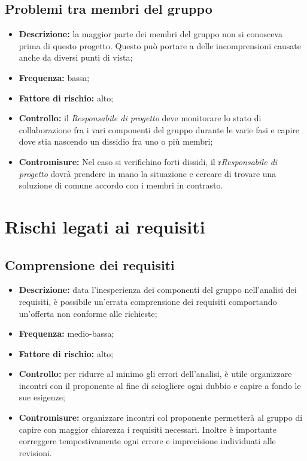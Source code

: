 \documentclass[./PianodiProgetto.tex]{subfiles}
\begin{document}
\subsection{Problemi tra membri del gruppo}
\begin{itemize}
	\item \textbf{Descrizione:} la maggior parte dei membri del gruppo non si conosceva prima di questo progetto. Questo può portare a delle incomprensioni causate anche da diversi punti di vista;
	\item \textbf{Frequenza:} bassa;
	\item \textbf{Fattore di rischio:} alto;
	\item \textbf{Controllo:} il \textit{Responsabile di progetto} deve monitorare lo stato di collaborazione fra i vari componenti del gruppo durante le varie fasi e capire dove stia nascendo un dissidio fra uno o più membri;
	\item \textbf{Contromisure:} Nel caso si verifichino forti dissidi, il r\textit{Responsabile di progetto} dovrà prendere in mano la situazione e cercare di trovare una soluzione di comune accordo con i membri in contrasto. 
\end{itemize}

\section{Rischi legati ai requisiti}
\subsection{Comprensione dei requisiti}
\begin{itemize}
	\item \textbf{Descrizione:} data l'inesperienza dei componenti del gruppo nell'analisi dei requisiti, è possibile un'errata comprensione dei requisiti comportando un'offerta non conforme alle richieste;
	\item \textbf{Frequenza:} medio-bassa;
	\item \textbf{Fattore di rischio:} alto;
	\item \textbf{Controllo:} per ridurre al minimo gli errori dell'analisi, è utile organizzare incontri con il proponente al fine di sciogliere ogni dubbio e capire a fondo le sue esigenze;
	\item \textbf{Contromisure:} organizzare incontri col proponente permetterà al gruppo di capire con maggior chiarezza i requisiti necessari. Inoltre è importante correggere tempestivamente ogni errore e imprecisione individuati alle revisioni. 
\end{itemize}
\end{document}
